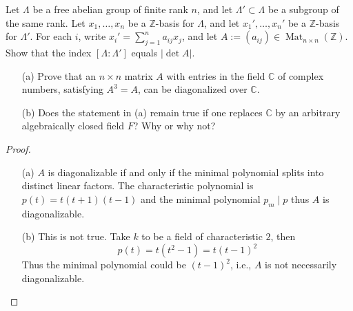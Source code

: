 \begin{prob}[F2017-Q2]
    Let \(\Lambda\) be a free abelian group of finite rank \(n\), and let \(\Lambda' \subset \Lambda\) be a subgroup of the same rank. Let \(x_1, \ldots, x_n\) be a \(\mathbb{Z}\)-basis for \(\Lambda\), and let \(x_1', \ldots, x_n'\) be a \(\mathbb{Z}\)-basis for \(\Lambda'\). For each \(i\), write \(x_i' = \sum_{j=1}^n a_{ij}x_j\), and let \(A := (a_{ij}) \in \operatorname{Mat}_{n \times n}(\mathbb{Z})\). Show that the index \([\Lambda : \Lambda']\) equals \(|\det A|\).
\end{prob}


\begin{prob}[S2001-Q5]
    \phantom{text}
    \begin{itemize}
        \item[(a)] Prove that an \( n \times n \) matrix \( A \) with entries in the field \( \mathbb{C} \) of complex numbers, satisfying \( A^3 = A \), can be diagonalized over \( \mathbb{C} \).
        
        \item[(b)] Does the statement in (a) remain true if one replaces \( \mathbb{C} \) by an arbitrary algebraically closed field \( F \)? Why or why not?
    \end{itemize}
\end{prob}
\begin{proof}
    \begin{itemize}
        \item[(a)] $A$ is diagonalizable if and only if the minimal polynomial splits into distinct linear factors. The characteristic polynomial is $p(t)=t(t+1)(t-1)$ and the minimal polynomial $p_m\mid p$ thus $A$ is diagonalizable.
        \item[(b)] This is not true. Take $k$ to be a field of characteristic $2$, then 
        \begin{equation*}
            p(t)=t(t^2-1)=t(t-1)^2
        \end{equation*}
        Thus the minimal polynomial could be $(t-1)^2$, i.e., $A$ is not necessarily diagonalizable.
    \end{itemize}
\end{proof}




